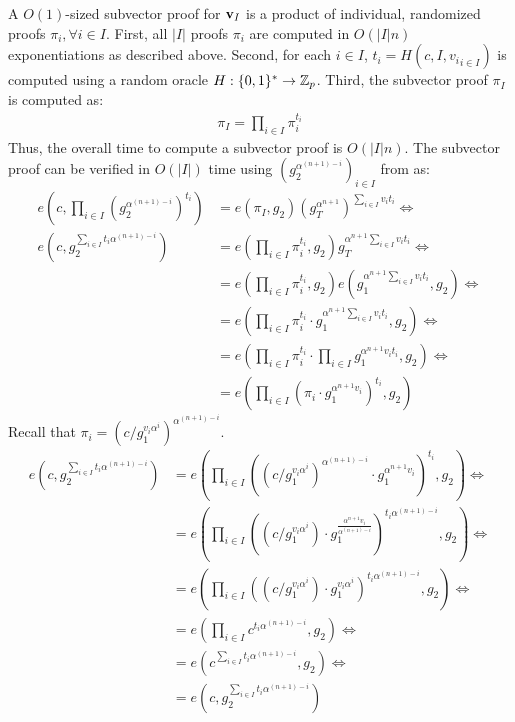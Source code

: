 A $O(1)$-sized subvector proof for $\bm{\mathrm{v}}_I$ is a product of individual, randomized proofs $\pi_i,\forall i\in I$.
First, all $|I|$ proofs $\pi_i$ are computed in $O(|I|n)$ exponentiations as described above.
Second, for each $i\in I$, $t_i = H(c, I, {v_i}_{i\in I})$ is computed using a random oracle $H : \{0,1\}^*\rightarrow \mathbb{Z}_p$.
Third, the subvector proof $\pi_I$ is computed as:
\begin{align}
\pi_I = \prod_{i\in I} \pi_i^{t_i}
\end{align}
Thus, the overall time to compute a subvector proof is $O(|I|n)$.
The subvector proof can be verified in $O(|I|)$ time using $(g_2^{\alpha^{(n+1) - i}})_{i\in I}$ from \vrk as:
\begin{align}
e\left(c, \prod_{i\in I}\left(g_2^{\alpha^{(n+1)-i}}\right)^{t_i}\right) &= e(\pi_I, g_2) \left(g_T^{\alpha^{n+1}}\right)^{\sum_{i\in I} v_i t_i}\Leftrightarrow\\
e\left(c, g_2^{\sum _{i\in I}t_i \alpha^{(n+1)-i}}\right) &= e\left(\prod_{i\in I} \pi_i^{t_i}, g_2\right) g_T^{\alpha^{n+1}\sum_{i\in I} v_i t_i}\Leftrightarrow\\
 &= e\left(\prod_{i\in I} \pi_i^{t_i}, g_2\right) e\left(g_1^{\alpha^{n+1}\sum_{i\in I} v_i t_i}, g_2\right)\Leftrightarrow\\
 &= e\left(\prod_{i\in I} \pi_i^{t_i} \cdot g_1^{\alpha^{n+1}\sum_{i\in I} v_i t_i},g_2\right)\Leftrightarrow\\
 &= e\left(\prod_{i\in I} \pi_i^{t_i} \cdot \prod_{i\in I} g_1^{\alpha^{n+1} v_i t_i},g_2\right)\Leftrightarrow\\
 &= e\left(\prod_{i\in I} \left(\pi_i \cdot g_1^{\alpha^{n+1} v_i}\right)^{t_i},g_2\right)
\end{align}
Recall that $\pi_i= (c / g_1^{v_i \alpha^i})^{\alpha^{(n+1) - i}}$.
\begin{align}
e\left(c, g_2^{\sum _{i\in I}t_i \alpha^{(n+1)-i}}\right) &= e\left(\prod_{i\in I} \left((c / g_1^{v_i \alpha^i})^{\alpha^{(n+1) - i}} \cdot g_1^{\alpha^{n+1} v_i}\right)^{t_i},g_2\right)\Leftrightarrow\\
 &= e\left(\prod_{i\in I} \left((c / g_1^{v_i \alpha^i}) \cdot g_1^\frac{\alpha^{n+1} v_i}{\alpha^{(n+1) - i}}\right)^{t_i \alpha^{(n+1) - i}},g_2\right)\Leftrightarrow\\
 &= e\left(\prod_{i\in I} \left((c / g_1^{v_i \alpha^i}) \cdot g_1^{v_i\alpha^i}\right)^{t_i \alpha^{(n+1) - i}},g_2\right)\Leftrightarrow\\
 &= e\left(\prod_{i\in I} c^{t_i \alpha^{(n+1) - i}},g_2\right)\Leftrightarrow\\
 &= e\left( c^{\sum_{i\in I}t_i \alpha^{(n+1) - i}},g_2\right)\Leftrightarrow\\
 &= e\left( c,g_2^{\sum_{i\in I}t_i \alpha^{(n+1) - i}}\right)
\end{align}

